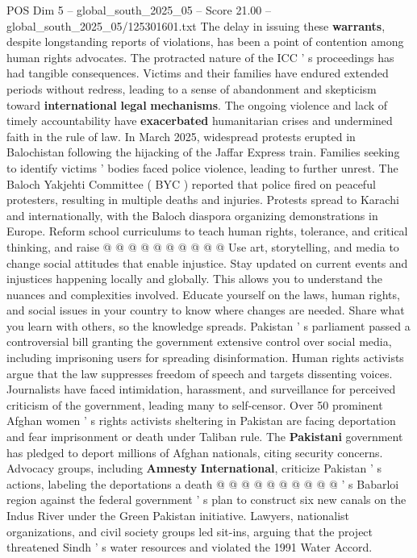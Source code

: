 \begin{textsample}{POS Dim 5 – global\_south\_2025\_05 – Score 21.00 – global\_south\_2025\_05/125301601.txt}
The delay in issuing these \textbf{warrants}, despite longstanding reports of violations, has been a point of contention among human rights advocates.
The protracted nature of the ICC ' s proceedings has had tangible consequences.
Victims and their families have endured extended periods without redress, leading to a sense of abandonment and skepticism toward \textbf{international} \textbf{legal} \textbf{mechanisms}.
The ongoing violence and lack of timely accountability have \textbf{exacerbated} humanitarian crises and undermined faith in the rule of law.
In March 2025, widespread protests erupted in Balochistan following the hijacking of the Jaffar Express train.
Families seeking to identify victims ' bodies faced police violence, leading to further unrest.
The Baloch Yakjehti Committee ( BYC ) reported that police fired on peaceful protesters, resulting in multiple deaths and injuries.
Protests spread to Karachi and internationally, with the Baloch diaspora organizing demonstrations in Europe.
Reform school curriculums to teach human rights, tolerance, and critical thinking, and raise @ @ @ @ @ @ @ @ @ @ Use art, storytelling, and media to change social attitudes that enable injustice.
Stay updated on current events and injustices happening locally and globally.
This allows you to understand the nuances and complexities involved.
Educate yourself on the laws, human rights, and social issues in your country to know where changes are needed.
Share what you learn with others, so the knowledge spreads.
Pakistan ' s parliament passed a controversial bill granting the government extensive control over social media, including imprisoning users for spreading disinformation.
Human rights activists argue that the law suppresses freedom of speech and targets dissenting voices.
Journalists have faced intimidation, harassment, and surveillance for perceived criticism of the government, leading many to self-censor.
Over 50 prominent Afghan women ' s rights activists sheltering in Pakistan are facing deportation and fear imprisonment or death under Taliban rule.
The \textbf{Pakistani} government has pledged to deport millions of Afghan nationals, citing security concerns.
Advocacy groups, including \textbf{Amnesty} \textbf{International}, criticize Pakistan ' s actions, labeling the deportations a death @ @ @ @ @ @ @ @ @ @ ' s Babarloi region against the federal government ' s plan to construct six new canals on the Indus River under the Green Pakistan initiative.
Lawyers, nationalist organizations, and civil society groups led sit-ins, arguing that the project threatened Sindh ' s water resources and violated the 1991 Water Accord.

\end{textsample}
